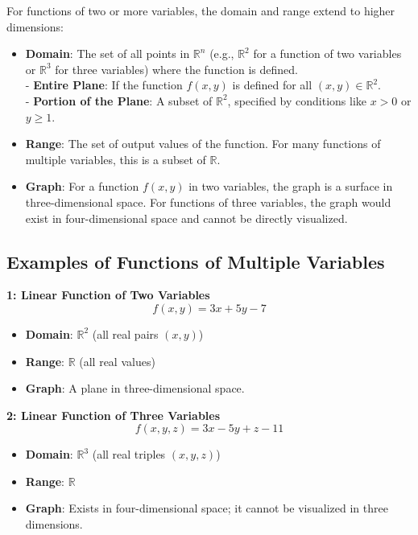 \documentclass[a4paper,12pt,openany]{book}
\begin{document}
For functions of two or more variables, the domain and range extend to higher dimensions:
\begin{itemize}
    \item \textbf{Domain}: The set of all points in \(\mathbb{R}^n\) (e.g., \(\mathbb{R}^2\) for a function of two variables or \(\mathbb{R}^3\) for three variables) where the function is defined.\\
        - \textbf{Entire Plane}: If the function \( f(x, y) \) is defined for all \((x, y) \in \mathbb{R}^2\).\\
        - \textbf{Portion of the Plane}: A subset of \(\mathbb{R}^2\), specified by conditions like \(x > 0\) or \(y \geq 1\).
    \item \textbf{Range}: The set of output values of the function. For many functions of multiple variables, this is a subset of \(\mathbb{R}\).
    \item \textbf{Graph}: For a function \( f(x, y) \) in two variables, the graph is a surface in three-dimensional space. For functions of three variables, the graph would exist in four-dimensional space and cannot be directly visualized.
\end{itemize}

\subsection*{Examples of Functions of Multiple Variables}

\textbf{1: Linear Function of Two Variables}
    \[
    f(x, y) = 3x + 5y - 7
    \]
    \begin{itemize}
        \item \textbf{Domain}: \(\mathbb{R}^2\) (all real pairs \((x, y)\))
        \item \textbf{Range}: \(\mathbb{R}\) (all real values)
        \item \textbf{Graph}: A plane in three-dimensional space.
    \end{itemize}

\textbf{2: Linear Function of Three Variables}
    \[
    f(x, y, z) = 3x - 5y + z - 11
    \]
    \begin{itemize}
        \item \textbf{Domain}: \(\mathbb{R}^3\) (all real triples \((x, y, z)\))
        \item \textbf{Range}: \(\mathbb{R}\)
        \item \textbf{Graph}: Exists in four-dimensional space; it cannot be visualized in three dimensions.
    \end{itemize}
\pagebreak
\end{document}
